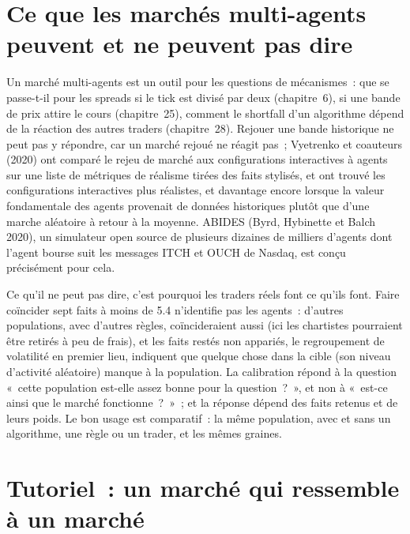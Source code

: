 \section{Ce que les marchés multi-agents peuvent et ne peuvent pas dire}

Un marché multi-agents est un outil pour les questions de mécanismes~: que se passe-t-il pour les spreads si le tick est divisé par deux (chapitre~6), si une bande de prix attire le
cours (chapitre~25), comment le shortfall d'un algorithme dépend de la réaction des autres traders (chapitre~28). Rejouer une bande historique ne peut pas y répondre,
car un marché rejoué ne réagit pas~; Vyetrenko et coauteurs (2020) ont comparé le rejeu de marché aux configurations interactives à agents sur une liste
de métriques de réalisme tirées des faits stylisés, et ont trouvé les configurations interactives plus réalistes, et davantage encore lorsque la valeur fondamentale des agents provenait de
données historiques plutôt que d'une marche aléatoire à retour à la moyenne. ABIDES (Byrd, Hybinette et Balch 2020), un simulateur open source de plusieurs dizaines de milliers
d'agents dont l'agent bourse suit les messages ITCH et OUCH de Nasdaq, est conçu précisément pour cela.

Ce qu'il ne peut pas dire, c'est pourquoi les traders réels font ce qu'ils font. Faire coïncider sept faits à moins de 5.4 n'identifie pas les agents~: d'autres populations,
avec d'autres règles, coïncideraient aussi (ici les chartistes pourraient être retirés à peu de frais), et les faits restés non appariés, le regroupement de volatilité
en premier lieu, indiquent que quelque chose dans la cible (son niveau d'activité aléatoire) manque à la population. La calibration répond à la question «~cette population est-elle assez
bonne pour la question~?~», et non à «~est-ce ainsi que le marché fonctionne~?~»~; et la réponse dépend des faits retenus et de leurs poids. Le bon usage est
comparatif~: la même population, avec et sans un algorithme, une règle ou un trader, et les mêmes graines.

\section{Tutoriel~: un marché qui ressemble à un marché}\label{tut:mx:build-an-agent-based-market:tut}

